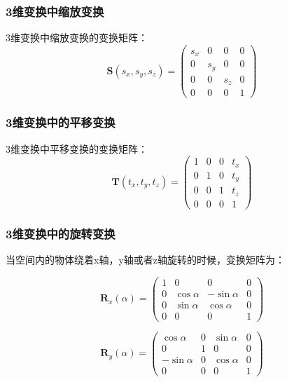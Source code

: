 \documentclass[openany]{progbookcn}
\begin{document}
\subsubsection{3维变换中缩放变换}
3维变换中缩放变换的变换矩阵：
\begin{equation}
	\textbf{S}(s_x,s_y,s_z)=\begin{pmatrix}s_x&0&0&0\\0&s_y&0&0\\0&0&s_z&0\\0&0&0&1\end{pmatrix}
\end{equation}

\subsubsection{3维变换中的平移变换}
3维变换中平移变换的变换矩阵：
\begin{equation}
	\textbf{T}(t_x,t_y,t_z)=\begin{pmatrix}1&0&0&t_x\\0&1&0&t_y\\0&0&1&t_z\\0&0&0&1\end{pmatrix}
\end{equation}

\subsubsection{3维变换中的旋转变换}

当空间内的物体绕着x轴，y轴或者z轴旋转的时候，变换矩阵为：

\begin{equation}
\textbf{R}_x(\alpha)=\begin{pmatrix}1&0&0&0\\0&\cos\alpha&-\sin\alpha&0\\0&\sin\alpha&\cos\alpha&0\\0&0&0&1\end{pmatrix}
\end{equation}

\begin{equation}
	\textbf{R}_y(\alpha)=\begin{pmatrix}\cos\alpha&0&\sin\alpha&0\\0&1&0&0\\-\sin\alpha&0&\cos\alpha&0\\0&0&0&1\end{pmatrix}
\end{equation}
\end{document}
